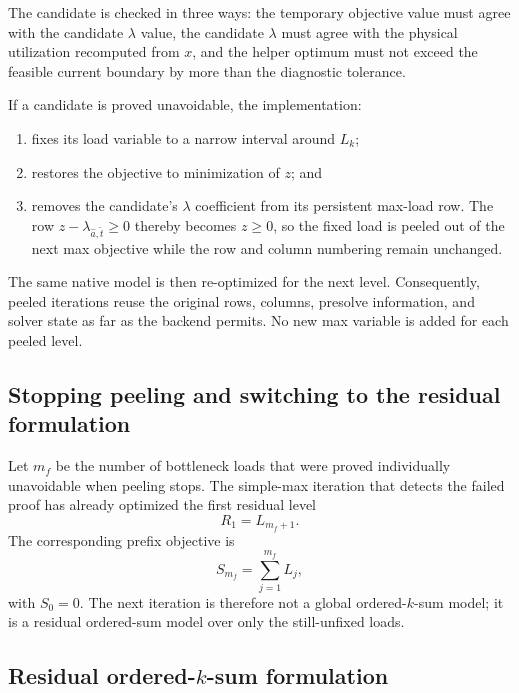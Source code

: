 \documentclass[11pt,a4paper]{article}
\begin{document}
The candidate is checked in three ways: the temporary objective value must agree
with the candidate $\lambda$ value, the candidate $\lambda$ must agree with the
physical utilization recomputed from $x$, and the helper optimum must not exceed
the feasible current boundary by more than the diagnostic tolerance.

If a candidate is proved unavoidable, the implementation:
\begin{enumerate}[nosep]
    \item fixes its load variable to a narrow interval around $L_k$;
    \item restores the objective to minimization of $z$; and
    \item removes the candidate's $\lambda$ coefficient from its persistent
    max-load row. The row $z-\lambda_{\hat a,\hat t}\geq0$ thereby becomes
    $z\geq0$, so the fixed load is peeled out of the next max objective while
    the row and column numbering remain unchanged.
\end{enumerate}

The same native model is then re-optimized for the next level. Consequently,
peeled iterations reuse the original rows, columns, presolve information, and
solver state as far as the backend permits. No new max variable is added for
each peeled level.

\subsection{Stopping peeling and switching to the residual formulation}

Let $m_f$ be the number of bottleneck loads that were proved individually
unavoidable when peeling stops. The simple-max iteration that detects the failed
proof has already optimized the first residual level
\[
R_1=L_{m_f+1}.
\]
The corresponding prefix objective is
\[
S_{m_f}=\sum_{j=1}^{m_f}L_j,
\]
with $S_0=0$. The next iteration is therefore not a global ordered-$k$-sum
model; it is a residual ordered-sum model over only the still-unfixed loads.

\subsection{Residual ordered-$k$-sum formulation}
\end{document}
